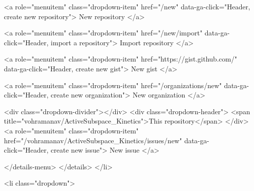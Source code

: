 <a role="menuitem" class="dropdown-item" href="/new" data-ga-click="Header, create new repository">
  New repository
</a>

  <a role="menuitem" class="dropdown-item" href="/new/import" data-ga-click="Header, import a repository">
    Import repository
  </a>

<a role="menuitem" class="dropdown-item" href="https://gist.github.com/" data-ga-click="Header, create new gist">
  New gist
</a>

  <a role="menuitem" class="dropdown-item" href="/organizations/new" data-ga-click="Header, create new organization">
    New organization
  </a>


  <div class="dropdown-divider"></div>
  <div class="dropdown-header">
    <span title="vohramanav/ActiveSubspace_Kinetics">This repository</span>
  </div>
    <a role="menuitem" class="dropdown-item" href="/vohramanav/ActiveSubspace_Kinetics/issues/new" data-ga-click="Header, create new issue">
      New issue
    </a>

      </details-menu>
    </details>
  </li>

  <li class="dropdown">

